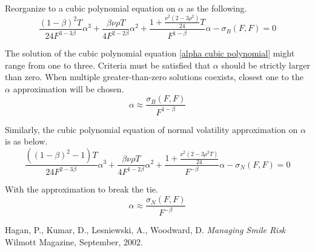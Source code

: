 \documentclass{article}
\begin{document}
Reorganize to a cubic polynomial equation on $ \alpha $ as the following.
\begin{equation} \label{alpha cubic polynomial}
    \frac{{(1 - \beta)}^2 T}{24 F^{3 - 3 \beta}} \alpha^3 + \frac{\beta \nu \rho T}{4 F^{2 - 2 \beta}} \alpha^2 + \frac{1 + \frac{\nu^2 \left(2 - 3 \rho^2\right)}{24} T}{F^{1 - \beta}} \alpha - \sigma_B\left(F, F\right) = 0
\end{equation}

The solution of the cubic polynomial equation \ref{alpha cubic polynomial} might range from one to three.
Criteria must be satisfied that $ \alpha $ should be strictly larger than zero.
When multiple greater-than-zero solutions coexists, closest one to the $ \alpha $ approximation will be chosen.
\begin{equation}
    \alpha \approx \frac{\sigma_B(F, F)}{F^{1 - \beta}}
\end{equation}

Similarly, the cubic polynomial equation of normal volatility approximation on $ \alpha $ is as below.
\begin{equation}
    \frac{\left(\left(1 - \beta\right)^2 - 1\right) T}{24 F^{2 - 3 \beta}} \alpha^3 + \frac{\beta \nu \rho T}{4 F^{1 - 2 \beta}} \alpha^2 + \frac{1 +  \frac{\nu^2 \left(2 - 3 \rho^2 T \right)}{24} }{F^{-\beta}} \alpha - \sigma_N\left(F, F\right) = 0
\end{equation}

With the approximation to break the tie.
\begin{equation}
    \alpha \approx \frac{\sigma_N \left(F, F \right)}{F^{-\beta}}
\end{equation}


\begin{thebibliography}{9}
Hagan, P., Kumar, D., Lesniewski, A., Woodward, D.
\textit{Managing Smile Risk}
Wilmott Magazine, September, 2002.
\end{thebibliography}
\end{document}
